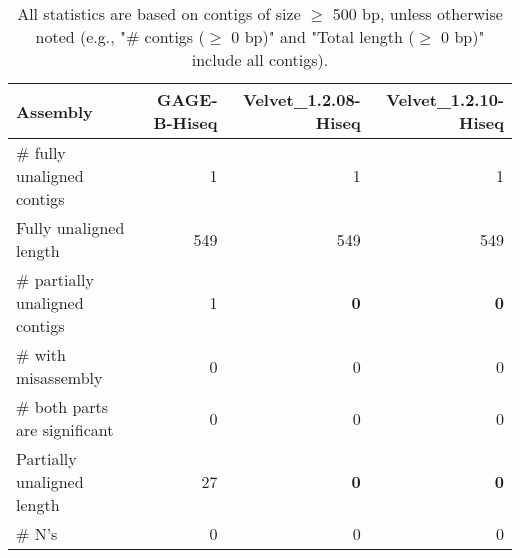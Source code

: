 \documentclass[12pt,a4paper]{article}
\begin{document}
\begin{table}[ht]
\begin{center}
\caption{All statistics are based on contigs of size $\geq$ 500 bp, unless otherwise noted (e.g., "\# contigs ($\geq$ 0 bp)" and "Total length ($\geq$ 0 bp)" include all contigs).}
\begin{tabular}{|l*{3}{|r}|}
\hline
Assembly & GAGE-B-Hiseq & Velvet\_1.2.08-Hiseq & Velvet\_1.2.10-Hiseq \\ \hline
\# fully unaligned contigs & 1 & 1 & 1 \\ \hline
Fully unaligned length & 549 & 549 & 549 \\ \hline
\# partially unaligned contigs & 1 & {\bf 0} & {\bf 0} \\ \hline
\hspace{5mm}\# with misassembly & 0 & 0 & 0 \\ \hline
\hspace{5mm}\# both parts are significant & 0 & 0 & 0 \\ \hline
Partially unaligned length & 27 & {\bf 0} & {\bf 0} \\ \hline
\# N's & 0 & 0 & 0 \\ \hline
\end{tabular}
\end{center}
\end{table}
\end{document}
